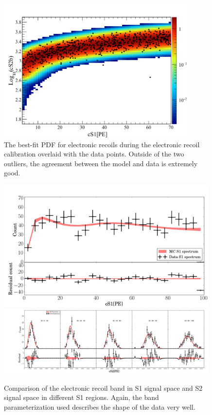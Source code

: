 \begin{figure}[t]
	\centering
	\includegraphics[width=0.9\textwidth]{xe1t_er_pdf_overlaid_data}
	\caption{The best-fit PDF for electronic recoils during the  electronic recoil calibration overlaid with the data points.  Outside of the two outliers, the agreement between the model and data is extremely good.}
	\label{fig:xe1t_er_pdf_overlaid_data}
	
\end{figure}
	
	
	
\begin{figure}[t]
	\centering
	\includegraphics[width=0.99\textwidth]{xe1t_er_band_s1}
	\includegraphics[width=0.99\textwidth]{xe1t_er_band_s2}
	\caption{Comparison of the electronic recoil band in S1 signal space and S2 signal space in different S1 regions.  Again, the band parameterization used describes the shape of the data very well.}
	\label{fig:xe1t_er_band_s1_s2}
\end{figure}

